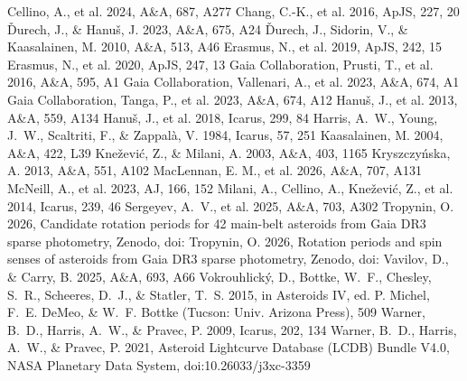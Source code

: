 \begin{thebibliography}{}
 Cellino, A., et al. 2024, A\&A, 687, A277
 Chang, C.-K., et al. 2016, ApJS, 227, 20
 \v{D}urech, J., \& Hanu\v{s}, J. 2023, A\&A, 675, A24
 \v{D}urech, J., Sidorin, V., \& Kaasalainen, M. 2010, A\&A, 513, A46
 Erasmus, N., et al. 2019, ApJS, 242, 15
 Erasmus, N., et al. 2020, ApJS, 247, 13
 Gaia Collaboration, Prusti, T., et al. 2016, A\&A, 595, A1
 Gaia Collaboration, Vallenari, A., et al. 2023, A\&A, 674, A1
 Gaia Collaboration, Tanga, P., et al. 2023, A\&A, 674, A12
 Hanu\v{s}, J., et al. 2013, A\&A, 559, A134
 Hanu\v{s}, J., et al. 2018, Icarus, 299, 84
 Harris, A.~W., Young, J.~W., Scaltriti, F., \& Zappal\`{a}, V. 1984, Icarus, 57, 251
 Kaasalainen, M. 2004, A\&A, 422, L39
 Kne\v{z}evi\'{c}, Z., \& Milani, A. 2003, A\&A, 403, 1165
 Kryszczy\'{n}ska, A. 2013, A\&A, 551, A102
 MacLennan, E. M., et al. 2026, A\&A, 707, A131
 McNeill, A., et al. 2023, AJ, 166, 152
 Milani, A., Cellino, A., Kne\v{z}evi\'{c}, Z., et al. 2014, Icarus, 239, 46
 Sergeyev, A.~V., et al. 2025, A\&A, 703, A302
 Tropynin, O. 2026, Candidate rotation periods for 42 main-belt asteroids from Gaia DR3 sparse photometry, Zenodo, doi:
 Tropynin, O. 2026, Rotation periods and spin senses of asteroids from Gaia DR3 sparse photometry, Zenodo, doi:
 Vavilov, D., \& Carry, B. 2025, A\&A, 693, A66
 Vokrouhlick\'{y}, D., Bottke, W.~F., Chesley, S.~R., Scheeres, D.~J., \& Statler, T.~S. 2015, in Asteroids IV, ed. P. Michel, F.~E. DeMeo, \& W.~F. Bottke (Tucson: Univ. Arizona Press), 509
 Warner, B.~D., Harris, A.~W., \& Pravec, P. 2009, Icarus, 202, 134
 Warner, B.~D., Harris, A.~W., \& Pravec, P. 2021, Asteroid Lightcurve Database (LCDB) Bundle V4.0, NASA Planetary Data System, doi:10.26033/j3xc-3359
\end{thebibliography}